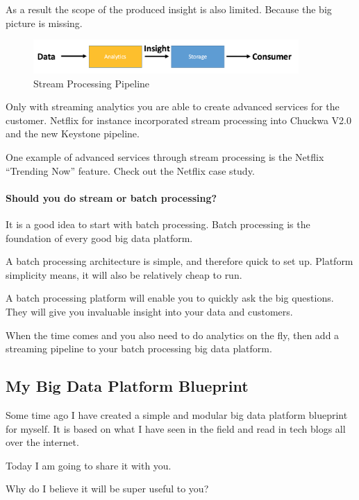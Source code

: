 \documentclass[12pt]{scrartcl} %
\begin{document}
As a result the scope of the produced insight is also limited. Because the big picture is missing.

\begin{figure}[htbp] 
  \centering
     \includegraphics[width=0.9\textwidth]{images/Simple-Stream-Processing-Workflow}
  \caption{Stream Processing Pipeline}
  \label{fig:Bild1}
\end{figure}

Only with streaming analytics you are able to create advanced services for the customer. Netflix for instance incorporated stream processing into Chuckwa V2.0 and the new Keystone pipeline.

One example of advanced services through stream processing is the Netflix “Trending Now” feature.
Check out the Netflix case study.

\paragraph{Should you do stream or batch processing?}

It is a good idea to start with batch processing. Batch processing is the foundation of every good big data platform.

A batch processing architecture is simple, and therefore quick to set up. Platform simplicity means, it will also be relatively cheap to run.

A batch processing platform will enable you to quickly ask the big questions. They will give you invaluable insight into your data and customers.

When the time comes and you also need to do analytics on the fly, then add a streaming pipeline to your batch processing big data platform.


\subsection {My Big Data Platform Blueprint}
Some time ago I have created a simple and modular big data platform blueprint for myself. It is based on what I have seen in the field and read in tech blogs all over the internet.

Today I am going to share it with you.

Why do I believe it will be super useful to you?
\end{document}
